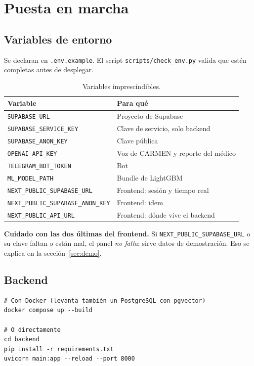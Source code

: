 \documentclass[11pt,a4paper]{article}
\begin{document}
\newpage
\section{Puesta en marcha}

\subsection{Variables de entorno}

Se declaran en \texttt{.env.example}. El script
\texttt{scripts/check\_env.py} valida que estén completas antes de desplegar.

\begin{table}[htbp]\centering
\begin{tabular}{@{}lp{7.4cm}@{}}
\toprule
\textbf{Variable} & \textbf{Para qué} \\
\midrule
\texttt{SUPABASE\_URL} & Proyecto de Supabase \\
\texttt{SUPABASE\_SERVICE\_KEY} & Clave de servicio, solo backend \\
\texttt{SUPABASE\_ANON\_KEY} & Clave pública \\
\texttt{OPENAI\_API\_KEY} & Voz de CARMEN y reporte del médico \\
\texttt{TELEGRAM\_BOT\_TOKEN} & Bot \\
\texttt{ML\_MODEL\_PATH} & Bundle de LightGBM \\
\texttt{NEXT\_PUBLIC\_SUPABASE\_URL} & Frontend: sesión y tiempo real \\
\texttt{NEXT\_PUBLIC\_SUPABASE\_ANON\_KEY} & Frontend: idem \\
\texttt{NEXT\_PUBLIC\_API\_URL} & Frontend: dónde vive el backend \\
\bottomrule
\end{tabular}
\caption{Variables imprescindibles.}
\end{table}

\textbf{Cuidado con las dos últimas del frontend.} Si
\texttt{NEXT\_PUBLIC\_SUPABASE\_URL} o su clave faltan o están mal, el panel
\emph{no falla}: sirve datos de demostración. Eso se explica en la
sección~\ref{sec:demo}.

\subsection{Backend}

\begin{lstlisting}
# Con Docker (levanta también un PostgreSQL con pgvector)
docker compose up --build

# O directamente
cd backend
pip install -r requirements.txt
uvicorn main:app --reload --port 8000
\end{lstlisting}
\end{document}
